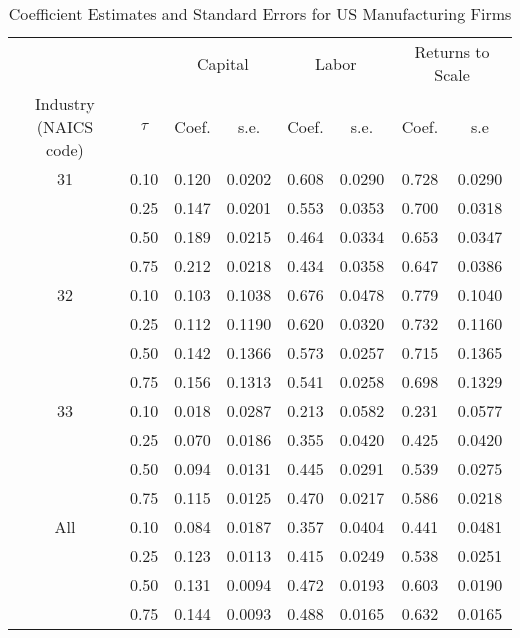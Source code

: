 \begin{table}[ht]
\centering
\caption{Coefficient Estimates and Standard Errors for US Manufacturing Firms} 
\begin{tabular}{cccccccc}
  \hline\hline & & \multicolumn{2}{c}{Capital}  & \multicolumn{2}{c}{Labor} & \multicolumn{2}{c}{Returns to Scale} \\ \cmidrule(lr){3-4} \cmidrule(lr){5-6} \cmidrule(lr){7-8}Industry (NAICS code) & $\tau$ & Coef. & s.e. & Coef. & s.e. & Coef. & s.e \\ 
  \hline
31 & 0.10 & 0.120 & 0.0202 & 0.608 & 0.0290 & 0.728 & 0.0290 \\ 
   & 0.25 & 0.147 & 0.0201 & 0.553 & 0.0353 & 0.700 & 0.0318 \\ 
   & 0.50 & 0.189 & 0.0215 & 0.464 & 0.0334 & 0.653 & 0.0347 \\ 
   & 0.75 & 0.212 & 0.0218 & 0.434 & 0.0358 & 0.647 & 0.0386 \\ 
  32 & 0.10 & 0.103 & 0.1038 & 0.676 & 0.0478 & 0.779 & 0.1040 \\ 
   & 0.25 & 0.112 & 0.1190 & 0.620 & 0.0320 & 0.732 & 0.1160 \\ 
   & 0.50 & 0.142 & 0.1366 & 0.573 & 0.0257 & 0.715 & 0.1365 \\ 
   & 0.75 & 0.156 & 0.1313 & 0.541 & 0.0258 & 0.698 & 0.1329 \\ 
  33 & 0.10 & 0.018 & 0.0287 & 0.213 & 0.0582 & 0.231 & 0.0577 \\ 
   & 0.25 & 0.070 & 0.0186 & 0.355 & 0.0420 & 0.425 & 0.0420 \\ 
   & 0.50 & 0.094 & 0.0131 & 0.445 & 0.0291 & 0.539 & 0.0275 \\ 
   & 0.75 & 0.115 & 0.0125 & 0.470 & 0.0217 & 0.586 & 0.0218 \\ 
  All & 0.10 & 0.084 & 0.0187 & 0.357 & 0.0404 & 0.441 & 0.0481 \\ 
   & 0.25 & 0.123 & 0.0113 & 0.415 & 0.0249 & 0.538 & 0.0251 \\ 
   & 0.50 & 0.131 & 0.0094 & 0.472 & 0.0193 & 0.603 & 0.0190 \\ 
   & 0.75 & 0.144 & 0.0093 & 0.488 & 0.0165 & 0.632 & 0.0165 \\ 
   \hline
\end{tabular}
\end{table}
